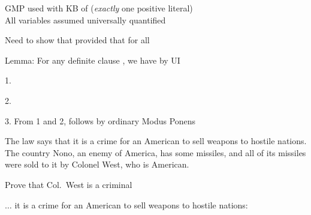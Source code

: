 \documentclass{article}
\begin{document}
\begin{huge}

GMP used with KB of  (\emph{exactly} one positive literal)\\
All variables assumed universally quantified


Need to show that 
provided that  for all 

Lemma: For any definite clause , we have  by UI

1. 

2. 

3. From 1 and 2,  follows by ordinary Modus Ponens


The law says that it is a crime for an American to sell weapons to
hostile nations.  The country Nono, an enemy of America,
has some missiles, and all of its missiles were sold to it by Colonel
West, who is American.

Prove that Col.~West is a criminal


$\ldots$ it is a crime for an American to sell weapons to hostile nations:


\end{huge}
\end{document}
